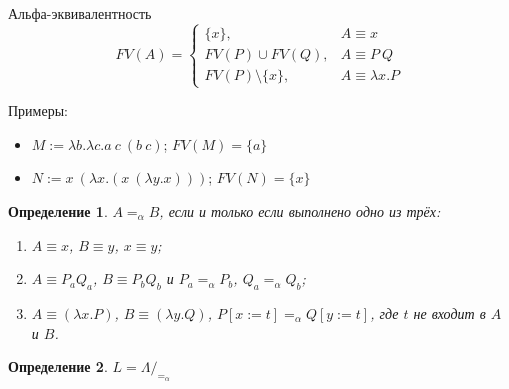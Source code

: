 \documentclass[aspectratio=169]{beamer}
\newtheorem{dfn}{Определение}[section]
\begin{document}
\begin{frame}{Альфа-эквивалентность}
$$FV(A) = \left\{\begin{array}{ll} \{x\}, & A \equiv x\\
  FV(P)\cup FV(Q), & A \equiv P\ Q\\
  FV(P)\setminus\{x\}, & A \equiv \lambda x.P\end{array}\right.$$

Примеры: 
\begin{itemize}
\item $M := \lambda b.\lambda c.a\ c\ (b\ c)$; $FV(M) = \{a\}$
\item $N := x\ (\lambda x.(x\ (\lambda y.x)))$; $FV(N) = \{x\}$
\end{itemize}

\begin{dfn}$A=_\alpha B$, если и только если выполнено одно из трёх:
\begin{enumerate}
\item $A \equiv x$, $B \equiv y$, $x \equiv y$;
\item $A \equiv P_a Q_a$, $B \equiv P_b Q_b$ и $P_a =_\alpha P_b$, $Q_a =_\alpha Q_b$;
\item $A \equiv (\lambda x.P)$, $B \equiv (\lambda y.Q)$, $P[x := t] =_\alpha Q[y := t]$, где $t$ не входит в $A$ и $B$.
\end{enumerate}\end{dfn}

\begin{dfn}$L = \Lambda/_{=_\alpha}$\end{dfn}
\end{frame}
\end{document}
